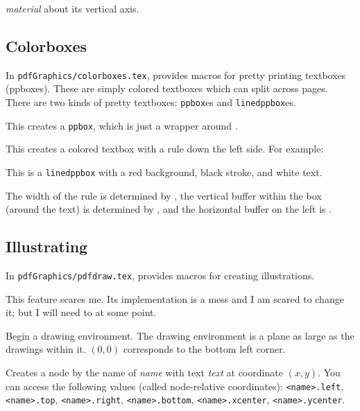 \quitvmode{} {\it material} about its vertical axis.
\emacroexp

\subsection{Colorboxes}

In {\tt pdfGraphics/colorboxes.tex}, \pdftoolbox{} provides macros for pretty printing textboxes (ppboxes).
These are simply colored textboxes which can split across pages.
There are two kinds of pretty textboxes: {\tt ppbox}es and {\tt linedppbox}es.

This creates a {\tt ppbox}, which is just a wrapper around \gotomacro\curvedcolorbox.
\emacroexp

This creates a colored textbox with a rule down the left side.
For example:

This is a {\tt linedppbox} with a red background, black stroke, and white text.
\elinedppbox

The width of the rule is determined by \macro\pprulewd, the vertical buffer within the box (around the text) is determined by \macro\pprulevbuf, and the horizontal buffer on the left is \macro\pprulehbuf.
\emacroexp

\subsection{Illustrating}

In {\tt pdfGraphics/pdfdraw.tex}, \pdftoolbox{} provides macros for creating illustrations.

\bwarning
This feature scares me.
Its implementation is a mess and I am scared to change it; but I will need to at some point.
\eppbox

Begin a drawing environment.
The drawing environment is a plane as large as the drawings within it.
$(0,0)$ corresponds to the bottom left corner.
\emacroexp

Creates a node by the name of {\it name} with text {\it text} at coordinate $(x,y)$.
You can access the following values (called node-relative coordinates): {\tt<name>.left}, {\tt<name>.top}, {\tt<name>.right}, {\tt<name>.bottom}, {\tt<name>.xcenter}, {\tt<name>.ycenter}.
\emacroexp

